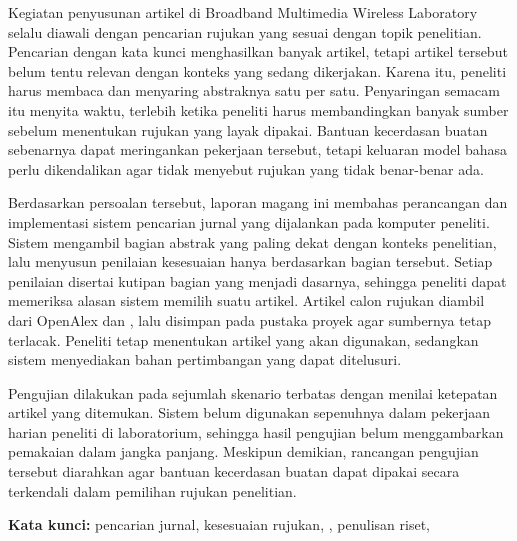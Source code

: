 
\begin{singlespace}
Kegiatan penyusunan artikel di Broadband Multimedia Wireless Laboratory selalu
diawali dengan pencarian rujukan yang sesuai dengan topik penelitian. Pencarian
dengan kata kunci menghasilkan banyak artikel, tetapi artikel tersebut belum
tentu relevan dengan konteks yang sedang dikerjakan. Karena itu, peneliti harus
membaca dan menyaring abstraknya satu per satu. Penyaringan semacam itu menyita
waktu, terlebih ketika peneliti harus membandingkan banyak sumber sebelum
menentukan rujukan yang layak dipakai. Bantuan kecerdasan buatan sebenarnya
dapat meringankan pekerjaan tersebut, tetapi keluaran model bahasa perlu
dikendalikan agar tidak menyebut rujukan yang tidak benar-benar ada.

Berdasarkan persoalan tersebut, laporan magang ini membahas perancangan dan
implementasi sistem pencarian jurnal yang dijalankan pada komputer peneliti.
Sistem mengambil bagian abstrak yang paling dekat dengan konteks penelitian,
lalu menyusun penilaian kesesuaian hanya berdasarkan bagian tersebut. Setiap
penilaian disertai kutipan bagian yang menjadi dasarnya, sehingga peneliti
dapat memeriksa alasan sistem memilih suatu artikel. Artikel calon rujukan
diambil dari OpenAlex dan , lalu disimpan pada pustaka
proyek agar sumbernya tetap terlacak. Peneliti tetap menentukan artikel yang
akan digunakan, sedangkan sistem menyediakan bahan pertimbangan yang dapat
ditelusuri.

Pengujian dilakukan pada sejumlah skenario terbatas dengan menilai ketepatan
artikel yang ditemukan. Sistem belum digunakan sepenuhnya dalam pekerjaan
harian peneliti di laboratorium, sehingga hasil pengujian belum menggambarkan
pemakaian dalam jangka panjang. Meskipun demikian, rancangan pengujian tersebut
diarahkan agar bantuan kecerdasan buatan dapat dipakai secara terkendali dalam
pemilihan rujukan penelitian.

\vspace{1\baselineskip}
\textbf{Kata kunci:} pencarian jurnal, kesesuaian rujukan,
, penulisan riset,
\end{singlespace}
